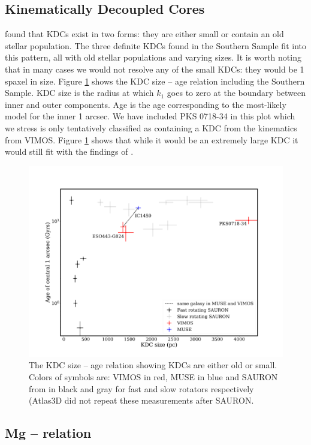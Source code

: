 {{{{	\subsection{Kinematically Decoupled Cores}
		\label{sec:popKDC}

		\citet{Kuntschner2010} found that KDCs exist in two forms: they are either small or contain an old stellar population. The three definite KDCs found in the Southern Sample fit into this pattern, all with old stellar populations and varying sizes. It is worth noting that in many cases we would not resolve any of the small KDCs: they would be 1 spaxel in size. Figure \ref{fig:KDC} shows the KDC size -- age relation including the Southern Sample. KDC size is the radius at which $k_1$ goes to zero at the boundary between inner and outer components. Age is the age corresponding to the most-likely model for the inner 1 arcsec. We have included PKS 0718-34 in this plot which we stress is only tentatively classified as containing a KDC from the kinematics from VIMOS. Figure \ref{fig:KDC} shows that while it would be an extremely large KDC it would still fit with the findings of \citet{Kuntschner2010}.

		\begin{figure}
			\centering
			\includegraphics[width=.8\textwidth]{chapter4/KDC_size_age.png}
			\caption[KDC dichotomy]{The KDC size -- age relation showing KDCs are either old or small. Colors of symbols are: VIMOS in red, MUSE in blue and SAURON from \citet{Kuntschner2010} in black and gray for fast and slow rotators respectively (Atlas3D did not repeat these measurements after SAURON.}
			\label{fig:KDC}
		\end{figure}


	\subsection{Mg -- \textsigma relation}
		\label{subsec:Mgsigma}

}}}}

